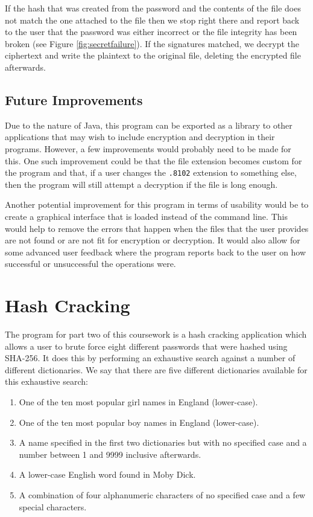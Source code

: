\documentclass[10pt,journal,compsoc]{IEEEtran}
\begin{document}
If the hash that was created from the password and the contents of the file
does not match the one attached to the file then we stop right there and report
back to the user that the password was either incorrect or the file integrity
has been broken (see Figure \ref{fig:secretfailure}). If the signatures matched,
we decrypt the ciphertext and write the plaintext to the original file,
deleting the encrypted file afterwards.

\subsection{Future Improvements}

Due to the nature of Java, this program can be exported as a library to other
applications that may wish to include encryption and decryption in their
programs. However, a few improvements would probably need to be made for this.
One such improvement could be that the file extension becomes custom for the
program and that, if a user changes the \texttt{.8102} extension to something
else, then the program will still attempt a decryption if the file is long
enough.

Another potential improvement for this program in terms of usability would be
to create a graphical interface that is loaded instead of the command line.
This would help to remove the errors that happen when the files that the user
provides are not found or are not fit for encryption or decryption. It would
also allow for some advanced user feedback where the program reports back to
the user on how successful or unsuccessful the operations were.

\section{Hash Cracking}\label{sec:hashcracking}

The program for part two of this coursework is a hash cracking application
which allows a user to brute force eight different passwords that were hashed
using SHA-256. It does this by performing an exhaustive search against a number
of different dictionaries. We say that there are five different dictionaries
available for this exhaustive search:

\begin{enumerate}
	\item One of the ten most popular girl names in England (lower-case).
	\item One of the ten most popular boy names in England (lower-case).
	\item A name specified in the first two dictionaries but with no specified
	case and a number between 1 and 9999 inclusive afterwards.
	\item A lower-case English word found in Moby Dick.
	\item A combination of four alphanumeric characters of no specified case
	and a few special characters.
\end{enumerate}
\end{document}
